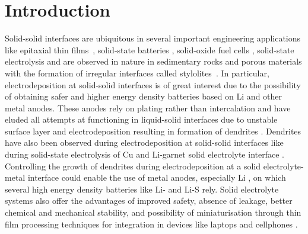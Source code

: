 \documentclass[%
reprint,
 amsmath,amssymb,
 aps,
 prb,
]{revtex4-1}
\begin{document}
\section{Introduction}\label{sec:intro}
Solid-solid interfaces are ubiquitous in several important engineering applications like epitaxial thin films~\cite{freund2004thin}, solid-state batteries \cite{Kato2016-ssb, solid-polymer-electrolytes-2008}, solid-oxide fuel cells \cite{ormerod2003solid}, solid-state electrolysis \cite{jordan1973purification, Lambert2002solid} and are observed in nature in sedimentary rocks and porous materials with the formation of irregular interfaces called stylolites~\cite{Angheluta2008}. In particular, electrodeposition at solid-solid interfaces is of great interest due to the possibility of obtaining safer and higher energy density batteries based on Li and other metal anodes. These anodes rely on plating rather than intercalation and  have eluded all attempts at functioning in liquid-solid interfaces due to unstable surface layer and electrodeposition resulting in formation of dendrites \cite{aurbach2000, aurbach-2002-failure, balsara2014-subsurface, PhysRevLett.56.1260, steiger2014dendrite}. Dendrites have also been observed during electrodeposition at solid-solid interfaces like during solid-state electrolysis of Cu \cite{Lambert2002solid} and Li-garnet solid electrolyte interface \cite{Ren2015direct}.  Controlling the growth of dendrites during electrodeposition at a solid electrolyte-metal interface could enable the use of metal anodes, especially Li \cite{XuLi2014}, on which several high energy density batteries like Li- and Li-S rely\cite{bruceLiOS2012, christensen2011-Liair, oleg2015TMR}. Solid electrolyte systems also offer the advantages of improved safety, absence of leakage, better chemical and mechanical stability, and possibility of miniaturisation through thin film processing techniques for integration in devices like laptops and cellphones \cite{wang2015design, knauth2002solid}. 
\end{document}
